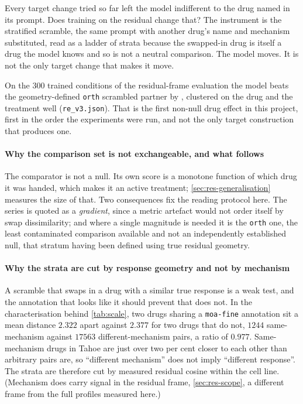 
\begin{question}[5]
Every target change tried so far left the model indifferent to the drug named in
its prompt. Does training on the residual change that? The instrument is the
stratified scramble, the same prompt with another drug's name and mechanism
substituted, read as a ladder of strata because the swapped-in drug is itself a
drug the model knows and so is not a neutral comparison. The model moves. It is
not the only target change that makes it move.
\end{question}

\noindent
On the $\num{300}$ trained conditions of the residual-frame evaluation the model
beats the geometry-defined \texttt{orth} scrambled partner by
, clustered on the drug and the treatment well
(\texttt{re\_v3.json}).
That is the first non-null drug effect in this project, first in the order the
experiments were run, and not the only target construction that produces one.

\paragraph{Why the comparison set is not exchangeable, and what follows} The
comparator is not a null. Its own score is a monotone function of which drug it
was handed, which makes it an active treatment; \cref{sec:res-generalisation}
measures the size of that. Two consequences fix the reading protocol here. The
series is quoted as a \emph{gradient}, since a metric artefact would not order
itself by swap dissimilarity; and where a single magnitude is needed it is the
\texttt{orth} one, the least contaminated comparison available and not an
independently established null, that stratum having been defined using true
residual geometry.

\paragraph{Why the strata are cut by response geometry and not by mechanism} A
scramble that swaps in a drug with a similar true response is a weak test, and
the annotation that looks like it should prevent that does not. In the
characterisation behind \cref{tab:scale}, two drugs sharing a \texttt{moa-fine}
annotation sit a mean distance $2.322$ apart against $2.377$ for two drugs that
do not, $\num{1244}$ same-mechanism against $\num{17563}$ different-mechanism
pairs, a ratio of $0.977$. Same-mechanism drugs in Tahoe are just over two per
cent closer to each other than arbitrary pairs are, so ``different mechanism''
does not imply ``different response''. The strata are therefore cut by measured
residual cosine within the cell line. (Mechanism does carry signal in the
residual frame, \cref{sec:res-scope}, a different frame from the full profiles
measured here.)


